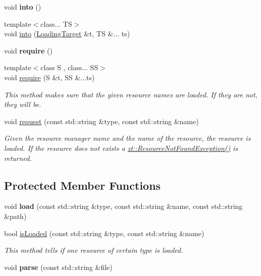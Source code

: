 \begin{DoxyCompactItemize}
void {\bfseries into} ()
\item 
{\footnotesize template$<$class... TS$>$ }\\void \hyperlink{classzt_1_1_resource_provider_aa23d6aefb7e5f147b37cf08e3c617b5b}{into} (\hyperlink{classzt_1_1_loading_target}{Loading\+Target} \&t, TS \&... ts)
\item 
\mbox{\label{classzt_1_1_resource_provider_ac54b02898020c6de5d55698d02383b85}} 
void {\bfseries require} ()
\item 
{\footnotesize template$<$class S , class... SS$>$ }\\void \hyperlink{classzt_1_1_resource_provider_af7a24c529d5255270e032198c985e603}{require} (S \&t, SS \&...ts)
\begin{DoxyCompactList}\small\item\em This method makes sure that the given resource names are loaded. If they are not, they will be. \end{DoxyCompactList}\item 
void \hyperlink{classzt_1_1_resource_provider_aa52dfc3f3022366aa279b78ca36b673e}{request} (const std\+::string \&type, const std\+::string \&name)
\begin{DoxyCompactList}\small\item\em Given the resource manager name and the name of the resource, the resource is loaded. If the resource does not exists a \hyperlink{classzt_1_1_resource_not_found_exception}{zt\+::\+Resource\+Not\+Found\+Exception()} is returned. \end{DoxyCompactList}\end{DoxyCompactItemize}
\subsection*{Protected Member Functions}
\begin{DoxyCompactItemize}
\item 
\mbox{\label{classzt_1_1_resource_provider_a77afe93ee461dffaa8c1f83b0641d3be}} 
void {\bfseries load} (const std\+::string \&type, const std\+::string \&name, const std\+::string \&path)
\item 
bool \hyperlink{classzt_1_1_resource_provider_a40819044cb7a63200d99f73a66887be1}{is\+Loaded} (const std\+::string \&type, const std\+::string \&name)
\begin{DoxyCompactList}\small\item\em This method tells if one resource of certain type is loaded. \end{DoxyCompactList}\item 
\mbox{\label{classzt_1_1_resource_provider_a65788988e5b6059d1eebaff68dacc1c8}} 
void {\bfseries parse} (const std\+::string \&file)
\end{DoxyCompactItemize}


